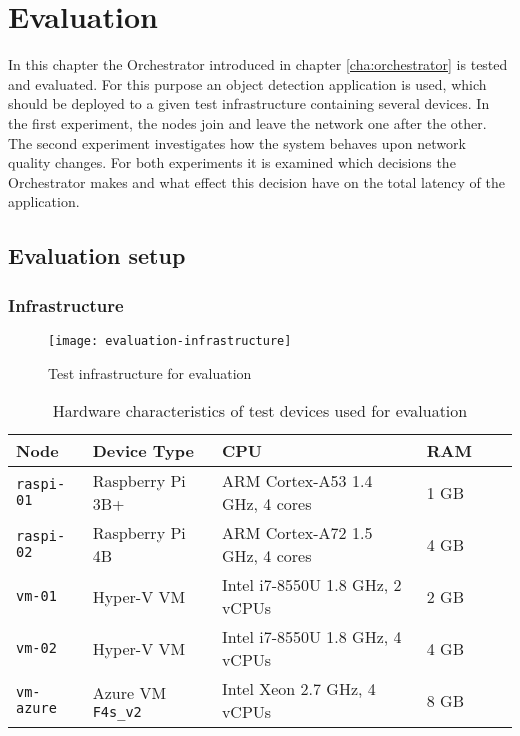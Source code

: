 \chapter{Evaluation\label{cha:evaluation}}

In this chapter the Orchestrator introduced in chapter \ref{cha:orchestrator} is tested and evaluated. For this purpose an object detection application is used, which should be deployed to a given test infrastructure containing several devices.
In the first experiment, the nodes join and leave the network one after the other.
The second experiment investigates how the system behaves upon network quality changes.
For both experiments it is examined which decisions the Orchestrator makes and what effect this decision have on the total latency of the application.







\section{Evaluation setup}

\subsection{Infrastructure\label{sec:eval-infrastructure}}

\begin{figure}[htb]
    \centering
    \texttt{[image: evaluation-infrastructure]}
    \caption{Test infrastructure for evaluation}
    \label{fig:evaluation-infrastructure}
\end{figure}

\begin{table}[htb]
    \centering
    \begin{tabular}{|l|l|l|l|l|l|}
    \hline
        \textbf{Node} & \textbf{Device Type} & \textbf{CPU} & \textbf{RAM} \\
         \hline
         \texttt{raspi-01} & Raspberry Pi 3B+ & ARM Cortex-A53 1.4 GHz, 4 cores & 1 GB\\
         \hline
         \texttt{raspi-02} & Raspberry Pi 4B & ARM Cortex-A72 1.5 GHz, 4 cores & 4 GB\\
         \hline
         \texttt{vm-01} & Hyper-V VM & Intel i7-8550U 1.8 GHz, 2 vCPUs & 2 GB\\
         \hline
         \texttt{vm-02} & Hyper-V VM & Intel i7-8550U 1.8 GHz, 4 vCPUs & 4 GB\\
         \hline
         \texttt{vm-azure} & Azure VM \texttt{F4s\_v2} & Intel Xeon 2.7 GHz, 4 vCPUs & 8 GB\\
         \hline
    \end{tabular}
    \caption{Hardware characteristics of test devices used for evaluation}
    \label{tab:evaluation-devices}
\end{table}

